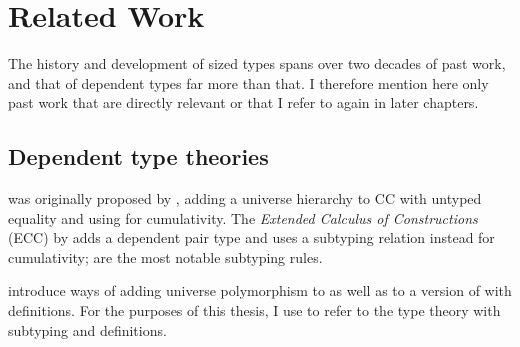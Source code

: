 \section{Related Work}

The history and development of sized types spans over two decades of past work,
and that of dependent types far more than that.
I therefore mention here only past work that are directly relevant
or that I refer to again in later chapters.

\subsection{Dependent type theories}

\GCC{}
was originally proposed by \citet{GCC-Coquand},
adding a universe hierarchy to CC with untyped equality
and using  for cumulativity.
The \emph{Extended Calculus of Constructions}
(ECC) by \citet{ECC} adds a dependent pair type
and uses a subtyping relation instead for cumulativity;
 are the most notable subtyping rules.

\vspace{-\baselineskip}

\citet{universes} introduce ways of adding universe polymorphism to \GCC
as well as to a version of \GCC with definitions.
For the purposes of this thesis, I use \GCC to refer to the type theory
with subtyping and definitions.


